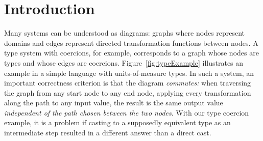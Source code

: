 \documentclass[sigplan,review,anonymous]{acmart}
\begin{document}
\section{Introduction}
\label{introduction}
Many systems can be understood as diagrams: graphs where nodes represent domains and edges represent directed transformation functions between nodes.
A type system with coercions, for example, corresponds to a graph whose nodes are types and whose edges are coercions.
Figure~\ref{fig:typeExample} illustrates an example in a simple language with units-of-measure types.
In such a system, an important correctness criterion is that the diagram \emph{commutes:} when traversing the graph from any start node to any end node, applying every transformation along the path to any input value, the result is the same output value \emph{independent of the path chosen between the two nodes}.
With our type coercion example, it is a problem if casting to a supposedly equivalent type as an intermediate step resulted in a different answer than a direct cast.
\end{document}
